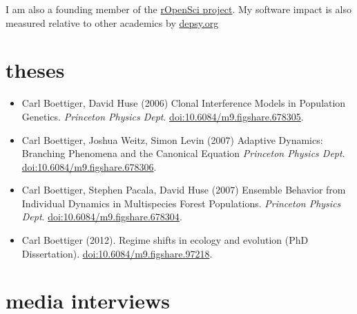 \documentclass[10pt,sans]{moderncv}        %
\providecommand{\tightlist}{%
    \setlength{\itemsep}{0pt}\setlength{\parskip}{0pt}}
\begin{document}
I am also a founding member of the \href{http://ropensci.org}{rOpenSci
project}. My software impact is also measured relative to other
academics by \href{http://depsy.org/person/329935}{depsy.org}

\section{theses}\label{theses}

\begin{itemize}
\tightlist
\item
  Carl Boettiger, David Huse (2006) Clonal Interference Models in
  Population Genetics. \emph{Princeton Physics Dept}.
  \href{http://dx.doi.org/10.6084/m9.figshare.678305}{doi:10.6084/m9.figshare.678305}.
\item
  Carl Boettiger, Joshua Weitz, Simon Levin (2007) Adaptive Dynamics:
  Branching Phenomena and the Canonical Equation \emph{Princeton Physics
  Dept}.
  \href{http://dx.doi.org/10.6084/m9.figshare.678306}{doi:10.6084/m9.figshare.678306}.
\item
  Carl Boettiger, Stephen Pacala, David Huse (2007) Ensemble Behavior
  from Individual Dynamics in Multispecies Forest Populations.
  \emph{Princeton Physics Dept}.
  \href{http://dx.doi.org/10.6084/m9.figshare.678304}{doi:10.6084/m9.figshare.678304}.
\item
  Carl Boettiger (2012). Regime shifts in ecology and evolution (PhD
  Dissertation).
  \href{http://dx.doi.org/10.6084/m9.figshare.97218}{doi:10.6084/m9.figshare.97218}.
\end{itemize}

\section{media interviews}\label{media-interviews}
\end{document}
